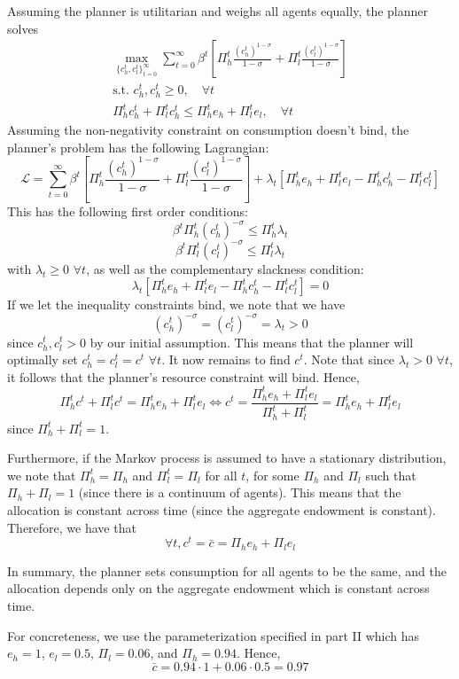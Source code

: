 \documentclass[12pt]{article}
\begin{document}
Assuming the planner is utilitarian and weighs all agents equally, the planner solves
\begin{align*}
    \max_{\{c_h^t, c_l^t\}_{t=0}^{\infty}} \sum_{t=0}^{\infty} \beta^t \left[\Pi_h^t \frac{(c_h^t)^{1-\sigma}}{1-\sigma} + \Pi_l^t \frac{(c_l^t)^{1-\sigma}}{1-\sigma} \right] \\
    \text{s.t. } c_h^t, c_h^t \geq 0, \quad \forall t\\
    \Pi_h^t c_h^t + \Pi_l^t c_h^t \leq \Pi_h^t e_h + \Pi_l^t e_l, \quad \forall t
\end{align*}
Assuming the non-negativity constraint on consumption doesn't bind, the planner's problem has the following Lagrangian:
\[\mathcal{L} = \sum_{t=0}^{\infty} \beta^t \left[\Pi_h^t \frac{(c_h^t)^{1-\sigma}}{1-\sigma} + \Pi_l^t \frac{(c_l^t)^{1-\sigma}}{1-\sigma} \right] + \lambda_t [\Pi_h^t e_h + \Pi_l^t e_l - \Pi_h^t c_h^t - \Pi_l^t c_l^t]\]
This has the following first order conditions:
\[\beta^t \Pi_h^t (c_h^t)^{-\sigma}  \leq \Pi_h^t \lambda_t \]
\[\beta^t \Pi_l^t (c_l^t)^{-\sigma} \leq \Pi_l^t \lambda_t \]
with $\lambda_t \geq 0$ $\forall t$, as well as the complementary slackness condition:
\[\lambda_t[\Pi_h^t e_h + \Pi_l^t e_l - \Pi_h^t c_h^t - \Pi_l^t c_l^t] = 0\]
If we let the inequality constraints bind, we note that we have
\[(c_h^t)^{-\sigma} =( c_l^t)^{-\sigma} = \lambda_t > 0\]
since $c_h^t, c_l^t >0$ by our initial assumption. This means that the planner will optimally set $c_h^t = c_l^t = c^t$ $\forall t$. It now remains to find $c^t$. Note that since $\lambda_t > 0$ $\forall t$, it follows that the planner's resource constraint will bind. Hence,
\[\Pi_h^t c^t + \Pi_l^t c^t = \Pi_h^t e_h + \Pi_l^t e_l \iff c^t = \frac{\Pi_h^t e_h + \Pi_l^t e_l}{\Pi_h^t + \Pi_l^t} =\Pi_h^t e_h + \Pi_l^t e_l \]
since $\Pi_h^t + \Pi_l^t = 1$.  

Furthermore, if the Markov process is assumed to have a stationary distribution, we note that $\Pi_h^t = \Pi_h$ and $\Pi_l^t = \Pi_l$ for all $t$, for some $\Pi_h$ and $\Pi_l$ such that $\Pi_h + \Pi_l = 1$ (since there is a continuum of agents). This means that the allocation is constant across time (since the aggregate endowment is constant). Therefore, we have that 
\[\forall t, c^t = \bar{c} = \Pi_h e_h + \Pi_l e_l\]

In summary, the planner sets consumption for all agents to be the same, and the allocation depends only on the aggregate endowment which is constant across time. 

For concreteness, we use the parameterization specified in part II which has $e_h = 1$, $e_l = 0.5$, $\Pi_l = 0.06$, and $\Pi_h = 0.94$. Hence,
\[\bar{c} = 0.94 \cdot 1 + 0.06 \cdot 0.5 = 0.97\]
\end{document}
